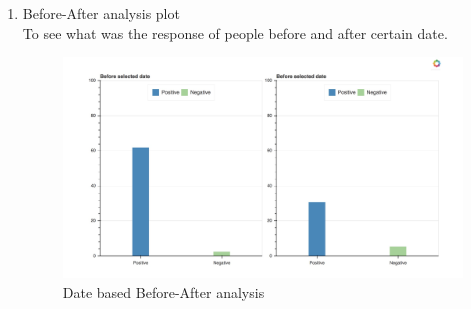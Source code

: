 \documentclass[journal, a4paper]{IEEEtran}
\begin{document}
\begin{enumerate}
  \item Before-After analysis plot\\ To see what was the response of people before and after certain date. 
  \begin{figure}[!hbt]
		\begin{center}
		\includegraphics[width=\columnwidth]{Screen_Shot_2018-05-01_at_7_17_10_PM}
%
		\caption{Date based Before-After analysis }
		\label{fig:tf_plot}
		\end{center}
	\end{figure}
    

\end{enumerate}
\end{document}
